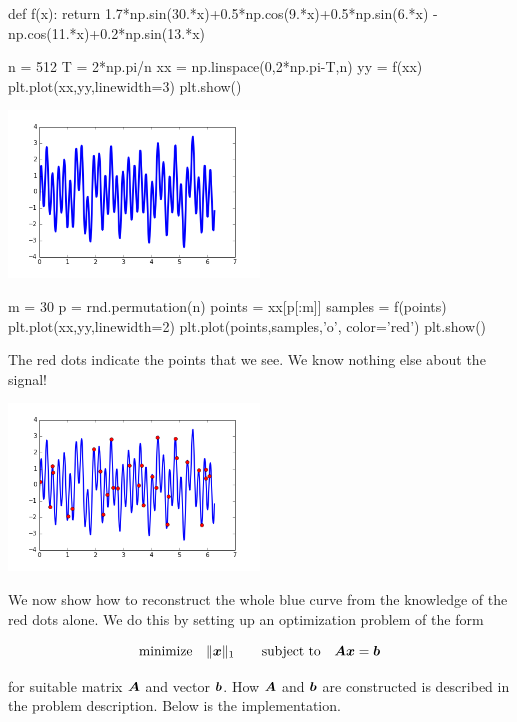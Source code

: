 \documentclass{article}
\begin{document}
\begin{itemize}
\begin{ipythonnb}
def f(x):
    return 1.7*np.sin(30.*x)+0.5*np.cos(9.*x)+0.5*np.sin(6.*x)
    -np.cos(11.*x)+0.2*np.sin(13.*x)
\end{ipythonnb}

\begin{ipythonnb}
n = 512
T = 2*np.pi/n
xx = np.linspace(0,2*np.pi-T,n)
yy = f(xx)
plt.plot(xx,yy,linewidth=3)
plt.show()
\end{ipythonnb}

\includegraphics[width=0.5\textwidth]{images/41.png}

\begin{ipythonnb}
m = 30
p = rnd.permutation(n)
points = xx[p[:m]]
samples = f(points)
plt.plot(xx,yy,linewidth=2)
plt.plot(points,samples,'o', color='red')
plt.show()
\end{ipythonnb}

The red dots indicate the points that we see. We know nothing else about the signal!

\includegraphics[width=0.5\textwidth]{images/42.png}

We now show how to reconstruct the whole blue curve from the knowledge of the red dots alone. We do this by setting up an optimization problem of the form

\begin{equation*}
  \text{minimize}\quad \|\bm{x}\|_1 \quad \quad\text{subject to}\quad \bm{A}\bm{x}=\bm{b}
\end{equation*}

for suitable matrix $\bm{A}$ and vector $\bm{b}$. How $\bm{A}$ and $\bm{b}$ are constructed is described in the problem description. Below is the implementation.


\end{itemize}
\end{document}
